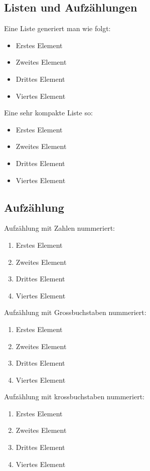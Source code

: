\documentclass[a4paper,12pt,twoside]{article}
\begin{document}
\subsection{Listen und Aufzählungen}

Eine Liste generiert man wie folgt:
\begin{itemize}
	\item Erstes Element
	\item Zweites Element
	\item Drittes Element
	\item Viertes Element
\end{itemize}

Eine sehr kompakte Liste so:
\begin{itemize}
	\vspace{-\topsep}
	\setlength{\itemsep}{0pt}\setlength{\parskip}{0pt}
	\item Erstes Element
	\item Zweites Element
	\item Drittes Element
	\item Viertes Element
\end{itemize}

\subsection{Aufzählung}

Aufzählung mit Zahlen nummeriert:
\begin{enumerate}
	\item Erstes Element
	\item Zweites Element
	\item Drittes Element
	\item Viertes Element
\end{enumerate}

Aufzählung mit Grossbuchstaben nummeriert:
\begin{enumerate}[label=\Alph*]
	\item Erstes Element
	\item Zweites Element
	\item Drittes Element
	\item Viertes Element
\end{enumerate}

Aufzählung mit krossbuchstaben nummeriert:
\begin{enumerate}[label=\alph*)]
	\item Erstes Element
	\item Zweites Element
	\item Drittes Element
	\item Viertes Element
\end{enumerate}
\end{document}
